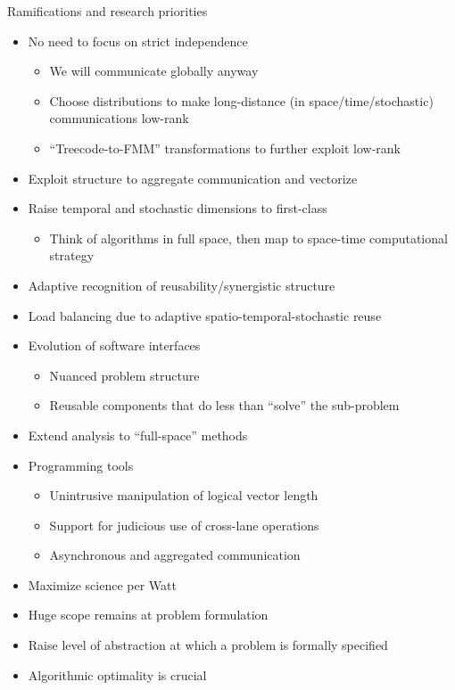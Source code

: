 \documentclass{beamer}
\begin{document}
\begin{frame}{Ramifications and research priorities}
  \begin{itemize}
  \item No need to focus on strict independence
    \begin{itemize}
    \item We will communicate globally anyway
    \item Choose distributions to make long-distance (in space/time/stochastic) communications low-rank
    \item ``Treecode-to-FMM'' transformations to further exploit low-rank
    \end{itemize}
  \item Exploit structure to aggregate communication and vectorize
  \item Raise temporal and stochastic dimensions to first-class
    \begin{itemize}
    \item Think of algorithms in full space, then map to space-time computational strategy
    \end{itemize}
  \item Adaptive recognition of reusability/synergistic structure
  \item Load balancing due to adaptive spatio-temporal-stochastic reuse
  \item Evolution of software interfaces
    \begin{itemize}
    \item Nuanced problem structure
    \item Reusable components that do less than ``solve'' the sub-problem
    \end{itemize}
  \item Extend analysis to ``full-space'' methods
  \item Programming tools
    \begin{itemize}
    \item Unintrusive manipulation of logical vector length
    \item Support for judicious use of cross-lane operations
    \item Asynchronous and aggregated communication
    \end{itemize}
  \end{itemize}
\end{frame}

\begin{frame}\LARGE
  \begin{itemize}
  \item Maximize science per Watt
  \item Huge scope remains at problem formulation
  \item Raise level of abstraction at which a problem is formally specified
  \item Algorithmic optimality is crucial
  \end{itemize}
\end{frame}
\end{document}

